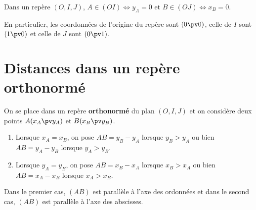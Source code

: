 \documentclass[10pt,openright,twoside,french]{book}
\begin{document}
\begin{Rmq}
    Dans un  repère $(O,I,J)$, $A \in (OI) \Leftrightarrow y_A = 0$ et $B \in (OJ) \Leftrightarrow x_B = 0$.\par
    En particulier,  les coordonnées de l'origine du repère sont $(0 \pv 0)$, celle de $I$ sont $(1 \pv 0)$ et celle de $J$ sont $(0 \pv 1)$.\par
\end{Rmq}

\section{Distances dans un repère orthonormé}
On se place dans un repère \textbf{orthonormé} du plan $(O,I,J)$ et on considère deux points $A(x_A \pv y_A)$ et $B(x_B \pv y_B)$.\par\medskip

\begin{Prop}
    \begin{enumerate}
        \item Lorsque $x_A = x_B$, on pose $AB = y_B - y_A$ lorsque $y_B > y_A$ ou bien $AB = y_A - y_B$ lorsque $y_A > y_B$.
        \item Lorsque $y_A = y_B$, on pose $AB = x_B - x_A$ lorsque $x_B > x_A$ ou bien $AB = x_A - x_B$ lorsque $x_A > x_B$.
    \end{enumerate}
\end{Prop}\medskip

\begin{Rmq}
    Dans le premier cas, $(AB)$ est parallèle à l'axe des ordonnées et dans le second cas, $(AB)$ est parallèle à l'axe des abscisses.
\end{Rmq}\medskip
\end{document}

